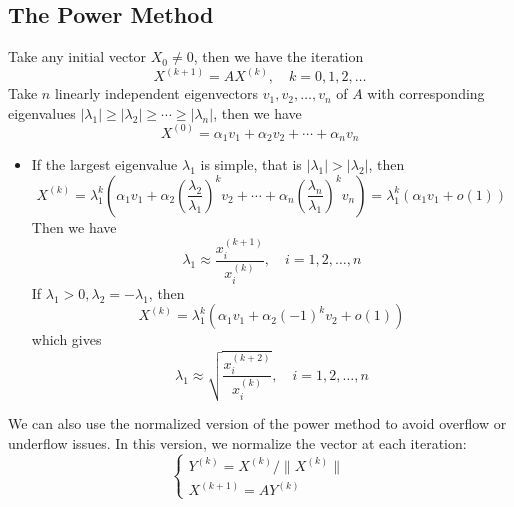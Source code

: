 \documentclass{matharticle}
\begin{document}
\subsection{The Power Method}
Take any initial vector $X_0 \neq 0$, then we have the iteration
\begin{equation}
	X^{(k+1)} = A X^{(k)}, \quad k = 0, 1, 2, \ldots
\end{equation}
Take $n$ linearly independent eigenvectors $v_1, v_2, \ldots, v_n$ of $A$ with corresponding eigenvalues $|\lambda_1| \geq |\lambda_2| \geq \cdots \geq |\lambda_n|$, then we have
\begin{equation*}
	X^{(0)} = \alpha_1 v_1 + \alpha_2 v_2 + \cdots + \alpha_n v_n
\end{equation*}
\begin{itemize}
	\item If the largest eigenvalue $\lambda_1$ is simple, that is $|\lambda_1| > |\lambda_2|$, then
	      \begin{equation*}
		      X^{(k)} = \lambda_1^k \left( \alpha_1 v_1 + \alpha_2 \left( \frac{\lambda_2}{\lambda_1} \right)^k v_2 + \cdots + \alpha_n \left( \frac{\lambda_n}{\lambda_1} \right)^k v_n \right) = \lambda_1^k (\alpha_1 v_1 + o(1))
	      \end{equation*}
	      Then we have
	      \begin{equation}
		      \lambda_1 \approx \frac{x_i^{(k+1)}}{x_i^{(k)}}, \quad i = 1, 2, \ldots, n
	      \end{equation}
	      If $\lambda_1 > 0, \lambda_2 = - \lambda_1$, then
	      \begin{equation*}
		      X^{(k)} = \lambda_1^k \left( \alpha_1 v_1 + \alpha_2 (-1)^k v_2 + o(1) \right)
	      \end{equation*}
	      which gives
	      \begin{equation}
		      \lambda_1 \approx \sqrt{\frac{x_i^{(k+2)}}{x_i^{(k)}}}, \quad i = 1, 2, \ldots, n
	      \end{equation}
\end{itemize}

We can also use the normalized version of the power method to avoid overflow or underflow issues. In this version, we normalize the vector at each iteration:
\begin{equation}
	\begin{cases}
		Y^{(k)} = X^{(k)} / \|X^{(k)}\| \\
		X^{(k+1)} = A Y^{(k)}
	\end{cases}
\end{equation}
\end{document}
